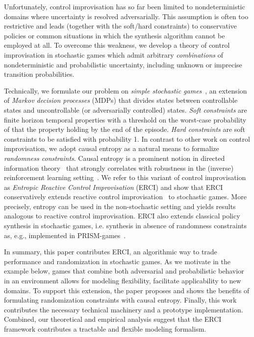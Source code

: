 Unfortunately, control improvisation has so far been limited to
nondeterministic domains where uncertainty is resolved
adversarially. This assumption is often too restrictive and leads
(together with the soft/hard constraints) to conservative policies or
common situations in which the synthesis algorithm cannot be employed
at all. To overcome this weakness, we develop a theory of control
improvisation in stochastic games which admit
arbitrary \emph{combinations} of nondeterministic and probabilistic
uncertainty, including unknown or imprecise transition
probabilities. 

Technically, we formulate our problem on \emph{simple stochastic
games}~\cite{DBLP:conf/dimacs/Condon90}, an extension of \emph{Markov decision processes} (MDPs) that divides states
between controllable states and uncontrollable (or adversarially
controlled) states. \emph{Soft constraints} are finite horizon
temporal properties with a threshold on the worst-case probability of
that the property holding by the end of the episode. \emph{Hard
constraints} are soft constraints to be satisfied with probability 1. In
contrast to other work on control improvisation, we adopt causal entropy as a natural means to formalize \emph{randomness
constraints}.  Causal entropy is a prominent notion in directed
information theory~\cite{DirectedInfoTheoery} that strongly correlates with robustness in the
(inverse) reinforcement learning setting~\cite{mceThesis,
maxEntAnswer}. We refer to this variant of control improvisation as
\emph{Entropic Reactive Control Improvisation} (ERCI) and show that ERCI
conservatively extends reactive control improvisation~\cite{DBLP:conf/cav/FremontS18} to stochastic
games. More precisely, entropy can
be used in the non-stochastic setting and yields results analogous to
reactive control improvisation. ERCI also extends  classical policy synthesis in stochastic games, i.e. synthesis in absence of randomness constraints as, e.g., implemented in PRISM-games~\cite{DBLP:journals/sttt/KwiatkowskaPW18}.


%
In summary, this paper contributes ERCI, an algorithmic way to trade
performance and randomization in stochastic games. As we motivate in
the example below, games that combine both adversarial and
probabilistic behavior in an environment allows for modeling
flexibility, facilitate applicability to new domains. To support this
extension, the paper proposes and shows the benefits of formulating
randomization constraints with causal entropy.  Finally, this work
contributes the necessary technical machinery and a prototype 
implementation. Combined, our theoretical and empirical analysis
suggest that the ERCI framework contributes a tractable and flexible
modeling formalism.

